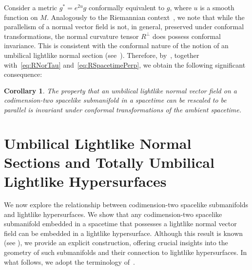 \documentclass[11pt]{article}
\numberwithin{equation}{section}
\newtheorem{corollary}[theorem]{Corollary}
\newtheorem{remark}[theorem]{Remark}
\begin{document}
Consider a metric \( g^* = e^{2u} g \) conformally equivalent to \( g \), where \( u \) is a smooth function on \( M \). Analogously to the Riemannian context~\cite{chen74}, we note that while the parallelism of a normal vector field is not, in general, preserved under conformal transformations, the normal curvature tensor \( R^\perp \) does possess conformal invariance. This is consistent with the conformal nature of the notion of an umbilical lightlike normal section (see~). Therefore, by~, together with~\eqref{eq:RNorTau} and~\eqref{eq:RSpacetimePerp}, we obtain the following significant consequence:

\begin{corollary}\label{corollary:ParaConformal}
	The property that an umbilical lightlike normal vector field on a codimension-two spacelike submanifold in a spacetime can be rescaled to be parallel is invariant under conformal transformations of the ambient spacetime.
\end{corollary}


	
	
	
	\section{Umbilical Lightlike Normal Sections and Totally Umbilical Lightlike Hypersurfaces}\label{sec:hyper}
	
	
	We now explore the relationship between codimension-two spacelike submanifolds and lightlike hypersurfaces. We show that any codimension-two spacelike submanifold embedded in a spacetime that possesses a lightlike normal vector field can be embedded in a lightlike hypersurface. Although this result is known (see \cite[p.~31]{kupeli}), we provide an explicit construction, offering crucial insights into the geometry of such submanifolds and their connection to lightlike hypersurfaces. In what follows, we adopt the terminology of~\cite{Bejancu1996}.
	
\end{document}
